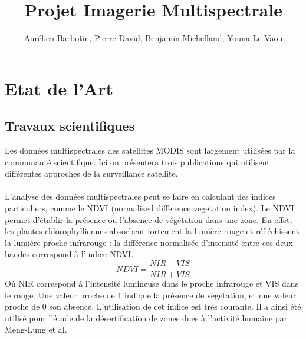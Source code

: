 \documentclass[a4paper,10pt]{article}
\begin{document}
 

\title{Projet Imagerie Multispectrale}
\author{Aurélien Barbotin, Pierre David, Benjamin Michelland, Youna Le Vaou}

\null  %
\nointerlineskip  %
\vfill
\let\snewpage \newpage
\let\newpage \relax
\maketitle
\let \newpage \snewpage
\vfill 
\break %

\tableofcontents
\newpage



\section{Etat de l'Art}
\subsection{Travaux scientifiques}

Les données multispectrales des satellites MODIS sont largement utilisées par la communauté scientifique. Ici on présentera trois publications qui utilisent différentes approches de la surveillance satellite.

\paragraph{}
L'analyse des données multispectrales peut se faire en calculant des indices particuliers, comme le NDVI (normalized difference vegetation index). Le NDVI permet d'établir la présence ou l'absence de végétation dans une zone. En effet, les plantes chlorophylliennes absorbent fortement la lumière rouge et réfléchissent la lumière proche infrarouge : la différence normalisée d'intensité entre ces deux bandes correspond à l'indice NDVI. 
\begin{equation}
NDVI=\frac{NIR-VIS}{NIR+VIS}
\end{equation}
Où NIR correspond à l'intensité lumineuse dans le proche infrarouge et VIS dans le rouge.\newline
Une valeur proche de 1 indique la présence de végétation, et une valeur proche de 0 son absence. L'utilisation de cet indice est très courante. Il a ainsi été utilisé pour l'étude de la désertification de zones dues à l'activité humaine\cite{desert} par Meng-Lung et al.
\end{document}
